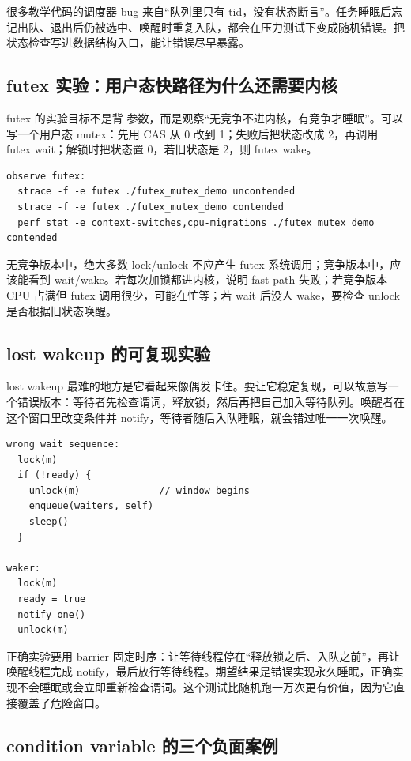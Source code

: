 很多教学代码的调度器 bug 来自“队列里只有 tid，没有状态断言”。任务睡眠后忘记出队、退出后仍被选中、唤醒时重复入队，都会在压力测试下变成随机错误。把状态检查写进数据结构入口，能让错误尽早暴露。

\subsection{futex 实验：用户态快路径为什么还需要内核}

futex 的实验目标不是背  参数，而是观察“无竞争不进内核，有竞争才睡眠”。可以写一个用户态 mutex：先用 CAS 从 0 改到 1；失败后把状态改成 2，再调用 futex wait；解锁时把状态置 0，若旧状态是 2，则 futex wake。

\begin{lstlisting}
observe futex:
  strace -f -e futex ./futex_mutex_demo uncontended
  strace -f -e futex ./futex_mutex_demo contended
  perf stat -e context-switches,cpu-migrations ./futex_mutex_demo contended
\end{lstlisting}

无竞争版本中，绝大多数 lock/unlock 不应产生 futex 系统调用；竞争版本中，应该能看到 wait/wake。若每次加锁都进内核，说明 fast path 失败；若竞争版本 CPU 占满但 futex 调用很少，可能在忙等；若 wait 后没人 wake，要检查 unlock 是否根据旧状态唤醒。

\subsection{lost wakeup 的可复现实验}

lost wakeup 最难的地方是它看起来像偶发卡住。要让它稳定复现，可以故意写一个错误版本：等待者先检查谓词，释放锁，然后再把自己加入等待队列。唤醒者在这个窗口里改变条件并 notify，等待者随后入队睡眠，就会错过唯一一次唤醒。

\begin{lstlisting}
wrong wait sequence:
  lock(m)
  if (!ready) {
    unlock(m)              // window begins
    enqueue(waiters, self)
    sleep()
  }

waker:
  lock(m)
  ready = true
  notify_one()
  unlock(m)
\end{lstlisting}

正确实验要用 barrier 固定时序：让等待线程停在“释放锁之后、入队之前”，再让唤醒线程完成 notify，最后放行等待线程。期望结果是错误实现永久睡眠，正确实现不会睡眠或会立即重新检查谓词。这个测试比随机跑一万次更有价值，因为它直接覆盖了危险窗口。

\subsection{condition variable 的三个负面案例}

